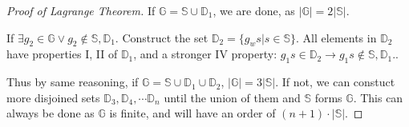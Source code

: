 \documentclass[12pt, a4paper]{report}
\theoremstyle{definition}
\theoremstyle{definition}
\theoremstyle{remark}
\begin{document}
\begin{proof}[Proof of Lagrange Theorem]
	If $\mathbb{G}=\mathbb{S}\cup \mathbb{D}_1$, we are done, as $|\mathbb{G}| = 2|\mathbb{S}|$. 

	If $\exists g_2 \in \mathbb{G} \lor g_2 \notin \mathbb{S}, \mathbb{D}_1$. 
	Construct the set $\mathbb{D}_2=\{g_ws|s \in \mathbb{S}\}$. All elements in $\mathbb{D}_2$ have properties I, II of $\mathbb{D}_1$, and a stronger IV property: 
	$g_1s \in \mathbb{D}_2 \rightarrow g_1s \notin \mathbb{S}, \mathbb{D}_1.$.

	Thus by same reasoning, if $\mathbb{G}=\mathbb{S}\cup \mathbb{D}_1 \cup \mathbb{D}_2$, $|\mathbb{G}| = 3|\mathbb{S}|$.
	If not, we can constuct more disjoined sets $\mathbb{D}_3, \mathbb{D}_4, \cdots \mathbb{D}_n$ until the union of them and $\mathbb{S}$ forms $\mathbb{G}$. This can always be done as $\mathbb{G}$ is finite, and will have an order of $(n+1)\cdot |\mathbb{S}|. $
\end{proof}



\appendix


\printbibliography
\end{document}
